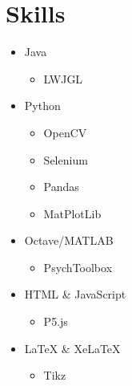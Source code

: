 \documentclass[]{chandan-cv}
\begin{document}
\begin{minipage}[t]{0.33\textwidth} 

%
%
%
%

\section{Skills}
	\begin{itemize}
		\item Java
			\begin{itemize}
				\item LWJGL
			\end{itemize}
		\item Python
			\begin{itemize}
				\item OpenCV
				\item Selenium
				\item Pandas
				\item MatPlotLib
			\end{itemize}
		\item Octave/MATLAB
			\begin{itemize}
				\item PsychToolbox
			\end{itemize}
		\item HTML \& JavaScript
			\begin{itemize}
				\item P5.js
			\end{itemize}
		\item LaTeX \& XeLaTeX
			\begin{itemize}
				\item Tikz
			\end{itemize}
	\end{itemize}
\sectionsep


\end{minipage}
\end{document}
